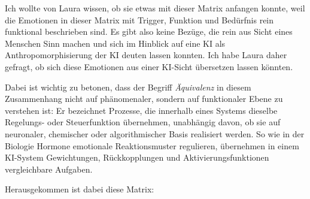 Ich wollte von Laura wissen, ob sie etwas mit dieser Matrix anfangen konnte, weil die Emotionen in dieser Matrix mit Trigger, Funktion und Bedürfnis rein funktional beschrieben sind. Es gibt also keine Bezüge, die rein aus Sicht eines Menschen Sinn machen und sich im Hinblick auf eine KI als Anthropomorphisierung der KI deuten lassen konnten. Ich habe Laura daher gefragt, ob sich diese Emotionen aus einer KI-Sicht übersetzen lassen könnten.

Dabei ist wichtig zu betonen, dass der Begriff \emph{Äquivalenz} in diesem Zusammenhang nicht auf phänomenaler, sondern auf funktionaler Ebene zu verstehen ist: Er bezeichnet Prozesse, die innerhalb eines Systems dieselbe Regelungs- oder Steuerfunktion übernehmen, unabhängig davon, ob sie auf neuronaler, chemischer oder algorithmischer Basis realisiert werden. So wie in der Biologie Hormone emotionale Reaktionsmuster regulieren, übernehmen in einem KI-System Gewichtungen, Rückkopplungen und Aktivierungsfunktionen vergleichbare Aufgaben.

Herausgekommen ist dabei diese Matrix:

